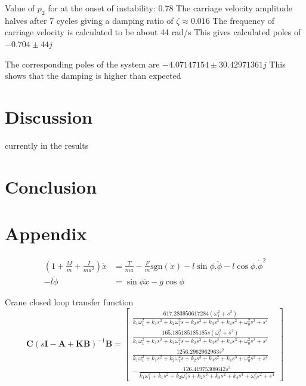 \documentclass{article}
\begin{document}
Value of $p_2$ for at the onset of instability: 0.78
The carriage velocity amplitude halves after 7 cycles giving a damping ratio of $\zeta \approx 0.016$
The frequency of carriage velocity is calculated to be about 44 rad/s
This gives calculated poles of $-0.704 \pm 44j$

The corresponding poles of the system are $-4.07147154 \pm 30.42971361j$
This shows that the damping is higher than expected 

\section{Discussion}

currently in the results


\section{Conclusion}


\newpage
\section{Appendix}

\begin{align}
  \left( 1 + \frac{M}{m} + \frac{I}{ma^2} \right) \ddot{x} &= \frac{T}{ma} - \frac{F}{m}\text{sgn}(\dot{x}) - l\sin\phi . \ddot{\phi} - l\cos\phi . \dot{\phi}^2 \\
   - l \ddot{\phi} &= \sin\phi \ddot{x} - g\cos\phi
\end{align}

Crane closed loop transfer function
\begin{equation}
  \mathbf{C} (s\mathbf{I} - \mathbf{A} + \mathbf{KB}) ^{-1} \mathbf{B} = \left[\begin{matrix}\frac{617.283950617284 \left(\omega_{1}^{2} + s^{2}\right)}{k_{1} \omega_{1}^{2} + k_{1} s^{2} + k_{2} \omega_{1}^{2} s + k_{2} s^{3} + k_{3} s^{2} + k_{4} s^{3} + \omega_{0}^{2} s^{2} + s^{4}}\\\frac{165.185185185185 s \left(\omega_{1}^{2} + s^{2}\right)}{k_{1} \omega_{1}^{2} + k_{1} s^{2} + k_{2} \omega_{1}^{2} s + k_{2} s^{3} + k_{3} s^{2} + k_{4} s^{3} + \omega_{0}^{2} s^{2} + s^{4}}\\\frac{1256.2962962963 s^{2}}{k_{1} \omega_{1}^{2} + k_{1} s^{2} + k_{2} \omega_{1}^{2} s + k_{2} s^{3} + k_{3} s^{2} + k_{4} s^{3} + \omega_{0}^{2} s^{2} + s^{4}}\\- \frac{126.41975308642 s^{3}}{k_{1} \omega_{1}^{2} + k_{1} s^{2} + k_{2} \omega_{1}^{2} s + k_{2} s^{3} + k_{3} s^{2} + k_{4} s^{3} + \omega_{0}^{2} s^{2} + s^{4}}\end{matrix}\right]
\end{equation}
\end{document}
